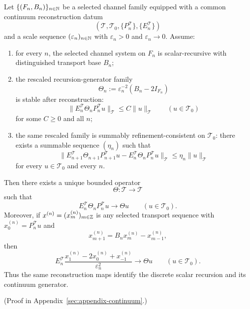 \begin{theorem}
\label{thm:scalar-recursion-identifies-continuum-generator}
Let \(\{(F_n,B_n)\}_{n\in\mathbb{N}}\) be a selected channel family equipped with a
common continuum reconstruction datum
\[
(\mathcal T,\mathcal T_0,\{P_n^{\mathcal T}\},\{E_n^{\mathcal T}\})
\]
and a scale sequence \((\varepsilon_n)_{n\in\mathbb{N}}\) with
\(\varepsilon_n>0\) and \(\varepsilon_n\to 0\). Assume:
\begin{enumerate}[label=(\roman*), leftmargin=2em, itemsep=0.2em]
\item for every \(n\), the selected channel system on \(F_n\) is
      scalar-recursive with distinguished transport base \(B_n\);
\item the rescaled recursion-generator family
      \[
      \Theta_n:=\varepsilon_n^{-2}(B_n-2I_{F_n})
      \]
      is stable after reconstruction:
      \[
      \|E_n^{\mathcal T}\Theta_nP_n^{\mathcal T}u\|_{\mathcal T}
      \le C\|u\|_{\mathcal T}
      \qquad (u\in\mathcal T_0)
      \]
      for some \(C\ge 0\) and all \(n\);
\item the same rescaled family is summably refinement-consistent on
      \(\mathcal T_0\): there exists a summable sequence \((\eta_n)\) such
      that
      \[
      \|E_{n+1}^{\mathcal T}\Theta_{n+1}P_{n+1}^{\mathcal T}u
      -
      E_n^{\mathcal T}\Theta_nP_n^{\mathcal T}u\|_{\mathcal T}
      \le
      \eta_n\|u\|_{\mathcal T}
      \]
      for every \(u\in\mathcal T_0\) and every \(n\).
\end{enumerate}
Then there exists a unique bounded operator
\[
\Theta:\mathcal T\to\mathcal T
\]
such that
\[
E_n^{\mathcal T}\Theta_nP_n^{\mathcal T}u\to \Theta u
\qquad (u\in\mathcal T_0).
\]
Moreover, if \(x^{(n)}=(x_m^{(n)})_{m\in\mathbb{Z}}\) is any selected transport
sequence with \(x_0^{(n)}=P_n^{\mathcal T}u\) and
\[
x_{m+1}^{(n)}=B_nx_m^{(n)}-x_{m-1}^{(n)},
\]
then
\[
E_n^{\mathcal T}\frac{x_1^{(n)}-2x_0^{(n)}+x_{-1}^{(n)}}{\varepsilon_n^2}
\to
\Theta u
\qquad (u\in\mathcal T_0).
\]
Thus the same reconstruction maps identify the discrete scalar recursion and
its continuum generator.
\end{theorem}

(Proof in Appendix~\ref{sec:appendix-continuum}.)

